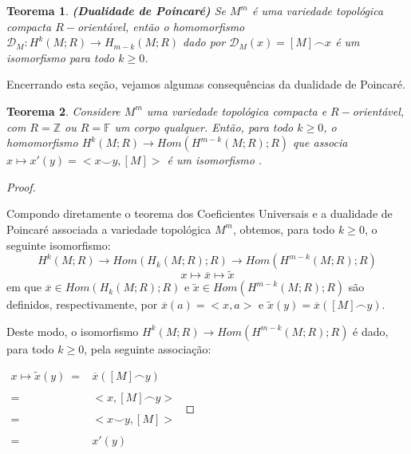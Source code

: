 \documentclass[12pt,oneside]{book} %
\newtheorem{teo}    {\hspace{0.5cm}Teorema}[chapter]
\newcommand{\Z}{\mathbb{Z}}
\newcommand{\F}{\mathbb{F}}
\newcommand{\ccup}{\smile}
\newcommand{\ccap}{\frown}
\newcommand{\wt}{\widetilde}
\begin{document}
\begin{teo}{\bf (Dualidade de Poincaré)}
	Se $M^{m}$ é uma variedade topológica compacta $R-$orientável, então o homomorfismo $\mathcal{D}_{M}:H^{k}(M;R)\to H_{m-k}(M;R)$ dado por $\mathcal{D}_{M}(x)=[M]\ccap x$ é um isomorfismo para todo $k\geq 0$.
\end{teo}

\par Encerrando esta seção, vejamos algumas consequências da dualidade de Poincaré.

\begin{teo}\label{base_dual_1}
	Considere $M^{m}$ uma variedade topológica compacta e $R-$orientável, com $R=\Z$ ou $R=\F$ um corpo qualquer. Então, para todo $k\geq 0$, o homomorfismo $H^{k}(M;R)\to Hom(H^{m-k}(M;R);R)$ que associa $x\mapsto x'(y)=<x\ccup y,[M]>$ é um isomorfismo .
\end{teo}

\begin{proof}
	
	\
	
	\par Compondo diretamente o teorema dos Coeficientes Universais e a dualidade de Poincaré associada a variedade topológica $M^{m}$, obtemos, para todo $k\geq 0$, o seguinte isomorfismo:
	$$ H^{k}(M;R)\to Hom(H_{k}(M;R);R)\to Hom(H^{m-k}(M;R);R) $$
	$$  x\mapsto\overline{x}\mapsto\wt{x} $$
	em que $\overline{x}\in Hom(H_{k}(M;R);R)$ e $\wt{x}\in Hom(H^{m-k}(M;R);R)$ são definidos, respectivamente, por $\overline{x}(a)=<x,a>$ e $\wt{x}(y)=\overline{x}([M]\ccap y)$.
	
	\par Deste modo, o isomorfismo $H^{k}(M;R)\to Hom(H^{m-k}(M;R);R)$ é dado, para todo $k\geq 0$, pela seguinte associação: \newline 
	
	$\begin{array}{rl}
		x\mapsto\wt{x}(y) \ = & \overline{x}([M]\ccap y) \\
		& \\
		= & <x,[M]\ccap y> \\
		& \\
		= & <x\ccup y,[M]> \\
		& \\
		= & x'(y)
	\end{array}$
	
\end{proof}
\end{document}
